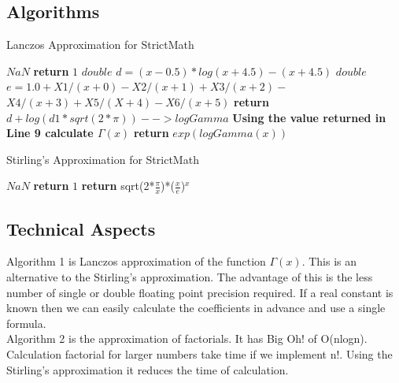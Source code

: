 \documentclass[12pt]{report}
\begin{document}
\subsection{Algorithms}
\begin{algorithm}
\caption{Lanczos Approximation for StrictMath}
\begin{algorithmic}[1]
\State $NaN$
\EndIf
{}
\State \textbf{return} $1$
\EndIf
{}
\State $double$ $d = (x-0.5) * log(x+4.5) - (x+4.5)$
\State $double$ $e = 1.0 + X1/(x+0) - X2/(x+1) + X3/(x+2) - $
\State $X4/(x+3) + X5/(X+4) - X6/(x+5)$
\State \textbf{return} $d + log(d1 * sqrt(2*\pi)) --> logGamma$
\EndIf
\State \textbf{Using the value returned in Line 9 calculate $\Gamma(x)$}
\State \textbf{return} $exp(logGamma(x))$

\end{algorithmic}
\end{algorithm}

\begin{algorithm}
\caption{Stirling's Approximation for StrictMath}
\begin{algorithmic}[1]
\State $NaN$
\EndIf
{}
\State \textbf{return} $1$
\EndIf
{}
\State \textbf{return}
sqrt(2*$\frac{\pi}{x}$)*($\frac{x}{e}$)$^x$
\EndIf
\end{algorithmic}
\end{algorithm}

\subsection{Technical Aspects}
Algorithm 1 is Lanczos approximation of the function $\Gamma(x).$ This is an alternative to the Stirling's approximation. The advantage of this is the less number of single or double floating point precision required. If a real constant is known then we can easily calculate the coefficients in advance and use a single formula.\\
\newline
Algorithm 2 is the approximation of factorials. It has Big Oh! of O(nlogn). Calculation factorial for larger numbers take time if we implement n!. Using the Stirling's approximation it reduces the time of calculation.
\end{document}
